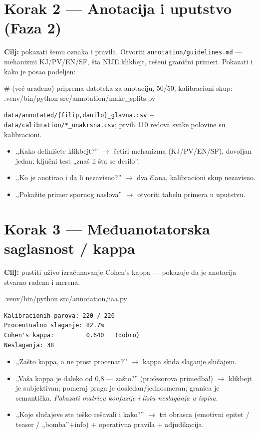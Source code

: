 \documentclass[11pt,a4paper]{article}
\newcommand{\kod}[1]{\texttt{#1}}
\begin{document}
\section{Korak 2 --- Anotacija i uputstvo (Faza 2)}
\textbf{Cilj:} pokazati šemu oznaka i pravila. Otvoriti \kod{annotation/guidelines.md}
--- mehanizmi KJ/PV/EN/SF, šta NIJE klikbejt, rešeni granični primeri. Pokazati i kako
je posao podeljen:
\begin{cmd}
# (već urađeno) priprema datoteka za anotaciju, 50/50, kalibracioni skup:
.venv/bin/python src/annotation/make_splits.py
\end{cmd}
\begin{izlaz}
\kod{data/annotated/\{filip,danilo\}\_glavna.csv} + \kod{data/calibration/*\_unakrsna.csv};
prvih 110 redova svake polovine su kalibracioni.
\end{izlaz}
\begin{pita}
\begin{itemize}[nosep]
  \item „Kako definišete klikbejt?'' $\to$ četiri mehanizma (KJ/PV/EN/SF), dovoljan
    jedan; ključni test „znaš li šta se desilo''.
  \item „Ko je anotirao i da li nezavisno?'' $\to$ dva člana, kalibracioni skup
    nezavisno.
  \item „Pokažite primer spornog naslova'' $\to$ otvoriti tabelu primera u uputstvu.
\end{itemize}
\end{pita}

\section{Korak 3 --- Međuanotatorska saglasnost / kappa}
\textbf{Cilj:} pustiti uživo izračunavanje Cohen's kappa --- pokazuje da je anotacija
stvarno rađena i merena.
\begin{cmd}
.venv/bin/python src/annotation/iaa.py
\end{cmd}
\begin{izlaz}
\begin{Verbatim}[fontsize=\small]
Kalibracionih parova: 220 / 220
Procentualno slaganje: 82.7%
Cohen's kappa:         0.640   (dobro)
Neslaganja: 38
\end{Verbatim}
\end{izlaz}
\begin{pita}
\begin{itemize}[nosep]
  \item „Zašto kappa, a ne prost procenat?'' $\to$ kappa skida slaganje slučajem.
  \item „Vaša kappa je daleko od 0,8 --- zašto?'' (profesorova primedba!) $\to$
    klikbejt je subjektivan; pomeraj praga je dosledan/jednosmeran; granica je
    semantička. \emph{Pokazati matricu konfuzije i listu neslaganja u ispisu.}
  \item „Koje slučajeve ste teško rešavali i kako?'' $\to$ tri obrasca (emotivni
    epitet / teaser / „bomba''+info) + operativna pravila + adjudikacija.
\end{itemize}
\end{pita}
\end{document}
